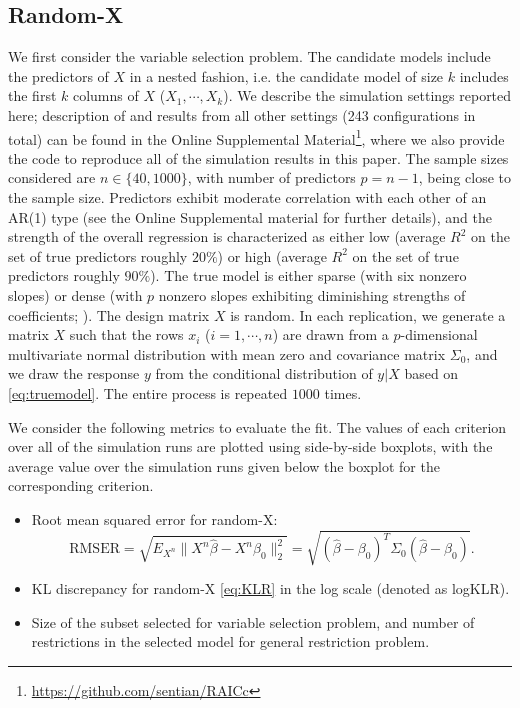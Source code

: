 \subsection{Random-X}
We first consider the variable selection problem. The candidate models include the predictors of $X$ in a nested fashion, i.e. the candidate model of size $k$ includes the first $k$ columns of $X$ ($X_1,\cdots,X_k$). We describe the simulation settings reported here; description of and results from all other settings (243 configurations in total) can be found in the Online Supplemental Material\footnote{\url{https://github.com/sentian/RAICc}}, where we also provide the code to reproduce all of the simulation results in this paper. The sample sizes considered are $n\in\{40, 1000\}$, with number of predictors $p=n-1$, being close to the sample size. Predictors exhibit moderate correlation with each other of an AR(1) type (see the Online Supplemental material for further details), and the strength of the overall regression is characterized as either low (average $R^2$ on the set of true predictors roughly $20\%$) or high (average $R^2$ on the set of true predictors roughly $90\%$). The true model is either sparse (with six nonzero slopes) or dense (with $p$ nonzero slopes exhibiting diminishing strengths of coefficients; \citealp{Taddy2017}). The design matrix $X$ is random. In each replication, we generate a matrix $X$ such that the rows $x_i$ ($i=1,\cdots,n$) are drawn from a $p$-dimensional multivariate normal distribution with mean zero and covariance matrix $\Sigma_0$, and we draw the response $y$ from the conditional distribution of $y|X$ based on \eqref{eq:truemodel}. The entire process is repeated $1000$ times. 

We consider the following metrics to evaluate the fit. The values of each criterion over all of the simulation runs are plotted using side-by-side boxplots, with the average value over the simulation runs given below the boxplot for the corresponding criterion.
\begin{itemize}
  \item Root mean squared error for random-X:
  \begin{equation*}
    \text{RMSER} = \sqrt{ E_{X^n} \lVert X^n\hat\beta-X^n\beta_0 \rVert_2^2 } =  \sqrt{ (\hat{\beta}-\beta_0)^T \Sigma_0 (\hat{\beta}-\beta_0) }.
  \end{equation*} 

  \item KL discrepancy for random-X \eqref{eq:KLR} in the log scale (denoted as logKLR).

  \item Size of the subset selected for variable selection problem, and number of restrictions in the selected model for general restriction problem.
\end{itemize}

